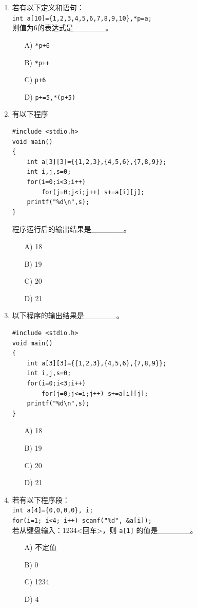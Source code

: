 \documentclass[a4paper,12pt]{article}
\begin{document}
\begin{enumerate}
	\item 若有以下定义和语句：\\
	      \texttt{int a[10]=\{1,2,3,4,5,6,7,8,9,10\},*p=a;}\\
	      则值为6的表达式是\_\_\_\_\_\_。
	      \begin{enumerate}
		      \item[A)] \texttt{*p+6}
		      \item[B)] \texttt{*p++}
		      \item[C)] \texttt{p+6}
		      \item[D)] \texttt{p+=5,*(p+5)}
	      \end{enumerate}
	      \vspace{0.3cm}

	\item 有以下程序
	      \begin{verbatim}
#include <stdio.h>
void main()
{
    int a[3][3]={{1,2,3},{4,5,6},{7,8,9}};
    int i,j,s=0;
    for(i=0;i<3;i++)
        for(j=0;j<i;j++) s+=a[i][j];
    printf("%d\n",s);
}
    \end{verbatim}
	      程序运行后的输出结果是\_\_\_\_\_\_。
	      \begin{enumerate}
		      \item[A)] 18
		      \item[B)] 19
		      \item[C)] 20
		      \item[D)] 21
	      \end{enumerate}
	      \vspace{0.3cm}

	\item 以下程序的输出结果是\_\_\_\_\_\_。
	      \begin{verbatim}
#include <stdio.h>
void main()
{
    int a[3][3]={{1,2,3},{4,5,6},{7,8,9}};
    int i,j,s=0;
    for(i=0;i<3;i++)
        for(j=0;j<=i;j++) s+=a[i][j];
    printf("%d\n",s);
}
    \end{verbatim}
	      \begin{enumerate}
		      \item[A)] 18
		      \item[B)] 19
		      \item[C)] 20
		      \item[D)] 21
	      \end{enumerate}
	      \vspace{0.3cm}

	\item 若有以下程序段：\\
	      \texttt{int a[4]=\{0,0,0,0\}, i;}\\
	      \texttt{for(i=1; i<4; i++) scanf("\%d", \&a[i]);}\\
	      若从键盘输入：1234<回车>，则 \texttt{a[1]} 的值是\_\_\_\_\_\_。
	      \begin{enumerate}
		      \item[A)] 不定值
		      \item[B)] 0
		      \item[C)] 1234
		      \item[D)] 4
	      \end{enumerate}
	      \vspace{0.3cm}


\end{enumerate}
\end{document}
